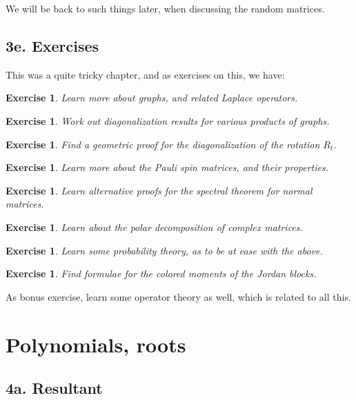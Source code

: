 \documentclass[12pt]{amsbook}
\newtheorem{exercise}[theorem]{Exercise}
\begin{document}
We will be back to such things later, when discussing the random matrices.

\section*{3e. Exercises}

This was a quite tricky chapter, and as exercises on this, we have:

\begin{exercise}
Learn more about graphs, and related Laplace operators.
\end{exercise}

\begin{exercise}
Work out diagonalization results for various products of graphs.
\end{exercise}

\begin{exercise}
Find a geometric proof for the diagonalization of the rotation $R_t$.
\end{exercise}

\begin{exercise}
Learn more about the Pauli spin matrices, and their properties.
\end{exercise}

\begin{exercise}
Learn alternative proofs for the spectral theorem for normal matrices.
\end{exercise}

\begin{exercise}
Learn about the polar decomposition of complex matrices.
\end{exercise}

\begin{exercise}
Learn some probability theory, as to be at ease with the above.
\end{exercise}

\begin{exercise}
Find formulae for the colored moments of the Jordan blocks.
\end{exercise}

As bonus exercise, learn some operator theory as well, which is related to all this.

\chapter{Polynomials, roots}

\section*{4a. Resultant}
\end{document}
